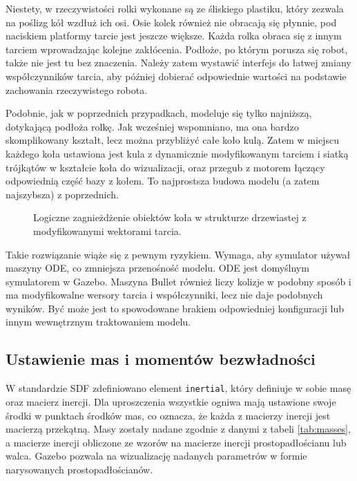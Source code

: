		Niestety, w rzeczywistości rolki wykonane są ze śliskiego plastiku, który zezwala na poślizg kół wzdłuż ich osi.
		Osie kolek również nie obracają się płynnie, pod naciskiem platformy tarcie jest jeszcze większe.
		Każda rolka obraca się z innym tarciem wprowadzając kolejne zakłócenia.
		Podłoże, po którym porusza się robot, także nie jest tu bez znaczenia.
		Należy zatem wystawić interfejs do łatwej zmiany współczynników tarcia, aby później dobierać odpowiednie wartości na podstawie zachowania rzeczywistego robota.

		Podobnie, jak w poprzednich przypadkach, modeluje się tylko najniższą, dotykającą podłoża rolkę.
		Jak wcześniej wspomniano, ma ona bardzo skomplikowany kształt, lecz można przybliżyć całe koło kulą.
		Zatem w miejscu każdego koła ustawiona jest kula z dynamicznie modyfikowanym tarciem i siatką trójkątów w kształcie koła do wizualizacji, 
		oraz przegub z motorem łączący odpowiednią część bazy z kołem.
		To najprostsza budowa modelu (a zatem najszybsza) z poprzednich.
		
		\begin{figure}[H]
		\caption{Logiczne zagnieżdżenie obiektów koła w strukturze drzewiastej z modyfikowanymi wektorami tarcia.}
		\label{fig:omnivelma_wheel}
		\end{figure}

		Takie rozwiązanie wiąże się z pewnym ryzykiem.
		Wymaga, aby symulator używał maszyny ODE, co zmniejsza przenośność modelu. ODE jest domyślnym symulatorem w Gazebo.
		Maszyna Bullet również liczy kolizje w podobny sposób i ma modyfikowalne wersory tarcia i współczynniki, 
		lecz nie daje podobnych wyników. Być może jest to spowodowane brakiem odpowiedniej konfiguracji lub innym wewnętrznym traktowaniem modelu.
		
	\subsection{Ustawienie mas i momentów bezwładności}
		W standardzie SDF zdefiniowano element \texttt{inertial}, który definiuje w sobie masę oraz macierz inercji. 
		Dla uproszczenia wszystkie ogniwa mają ustawione swoje środki w punktach środków mas, co oznacza, że każda z macierzy inercji jest macierzą przekątną.
		Masy zostały nadane zgodnie z danymi z tabeli \ref{tab:masses}, a macierze inercji obliczone ze wzorów na macierze inercji prostopadłościanu lub walca.
		Gazebo pozwala na wizualizację nadanych parametrów w formie narysowanych prostopadłościanów.
		
